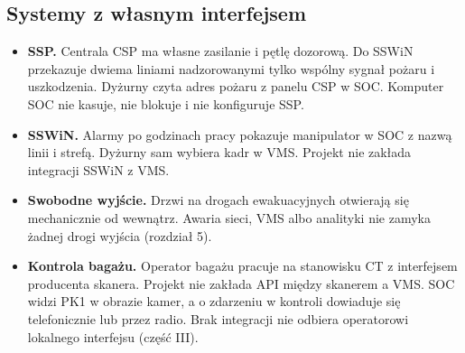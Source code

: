\subsection*{Systemy z własnym interfejsem}
\begin{itemize}[noitemsep]
  \item \textbf{SSP.} Centrala CSP ma własne zasilanie i pętlę dozorową. Do SSWiN przekazuje dwiema liniami nadzorowanymi tylko wspólny sygnał pożaru i uszkodzenia. Dyżurny czyta adres pożaru z panelu CSP w SOC. Komputer SOC nie kasuje, nie blokuje i nie konfiguruje SSP.\cite{S-FIRE}
  \item \textbf{SSWiN.} Alarmy po godzinach pracy pokazuje manipulator w SOC z nazwą linii i strefą. Dyżurny sam wybiera kadr w VMS. Projekt nie zakłada integracji SSWiN z VMS.\cite{S-SSWIN}
  \item \textbf{Swobodne wyjście.} Drzwi na drogach ewakuacyjnych otwierają się mechanicznie od wewnątrz. Awaria sieci, VMS albo analityki nie zamyka żadnej drogi wyjścia (rozdział 5).
  \item \textbf{Kontrola bagażu.} Operator bagażu pracuje na stanowisku CT z interfejsem producenta skanera. Projekt nie zakłada API między skanerem a VMS. SOC widzi PK1 w obrazie kamer, a o zdarzeniu w kontroli dowiaduje się telefonicznie lub przez radio. Brak integracji nie odbiera operatorowi lokalnego interfejsu (część III).
\end{itemize}
